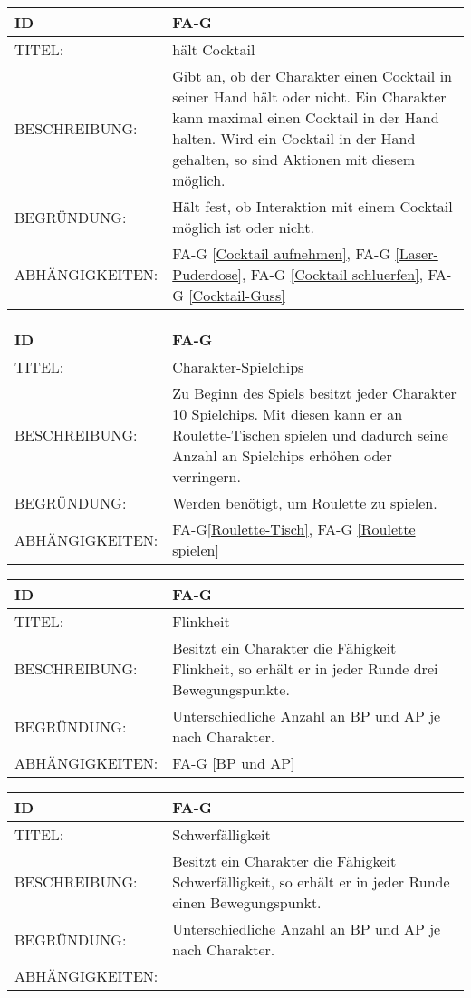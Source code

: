 \begin{tabularx}{16cm}{l|X}
	{table}\label{haelt Cocktail}
	\textbf{ID} & \textbf{FA-G \arabic{table}} \\
	\hline
	TITEL: & hält Cocktail \\
	\hline
	BESCHREIBUNG: & Gibt an, ob der Charakter einen Cocktail in seiner Hand hält oder nicht. Ein Charakter kann maximal einen Cocktail in der Hand halten. Wird ein Cocktail in der Hand gehalten, so sind Aktionen mit diesem möglich. \\
	\hline
	BEGRÜNDUNG: & Hält fest, ob Interaktion mit einem Cocktail möglich ist oder nicht.\\
	\hline
	ABHÄNGIGKEITEN: & FA-G \ref{Cocktail aufnehmen}, FA-G \ref{Laser-Puderdose}, FA-G \ref{Cocktail schluerfen}, FA-G \ref{Cocktail-Guss}\\
\end{tabularx}

\begin{tabularx}{16cm}{l|X}
	{table}\label{Charakter-Spielchips}
	\textbf{ID} & \textbf{FA-G \arabic{table}} \\
	\hline
	TITEL: & Charakter-Spielchips \\
	\hline
	BESCHREIBUNG: & Zu Beginn des Spiels besitzt jeder Charakter 10 Spielchips. Mit diesen kann er an Roulette-Tischen spielen und dadurch seine Anzahl an Spielchips erhöhen oder verringern.\\
	\hline
	BEGRÜNDUNG: & Werden benötigt, um Roulette zu spielen.\\
	\hline
	ABHÄNGIGKEITEN: & FA-G\ref{Roulette-Tisch}, FA-G \ref{Roulette spielen}\\
\end{tabularx}

\begin{tabularx}{16cm}{l|X}
	{table}\label{Flinkheit}
	\textbf{ID} & \textbf{FA-G \arabic{table}} \\
	\hline
	TITEL: & Flinkheit \\
	\hline
	BESCHREIBUNG: & Besitzt ein Charakter die Fähigkeit Flinkheit, so erhält er in jeder Runde drei Bewegungspunkte.\\
	\hline
	BEGRÜNDUNG: & Unterschiedliche Anzahl an BP und AP je nach Charakter.\\
	\hline
	ABHÄNGIGKEITEN: & FA-G \ref{BP und AP}\\
\end{tabularx}

\begin{tabularx}{16cm}{l|X}
	{table}\label{Schwerfaelligkeit}
	\textbf{ID} & \textbf{FA-G \arabic{table}} \\
	\hline
	TITEL: & Schwerfälligkeit \\
	\hline
	BESCHREIBUNG: & Besitzt ein Charakter die Fähigkeit Schwerfälligkeit, so erhält er in jeder Runde einen Bewegungspunkt.\\
	\hline
	BEGRÜNDUNG: & Unterschiedliche Anzahl an BP und AP je nach Charakter.\\
	\hline
	ABHÄNGIGKEITEN: & \\
\end{tabularx}

